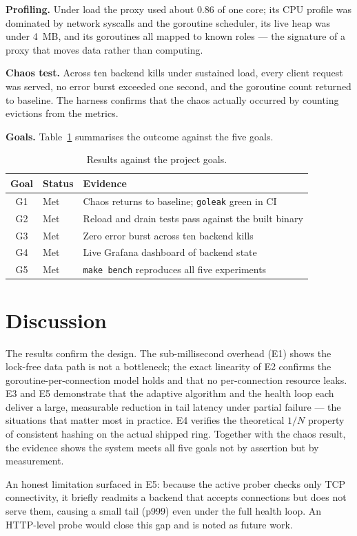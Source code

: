 \documentclass[11pt,a4paper]{report}
\newcommand{\code}[1]{\texttt{#1}}
\begin{document}
\textbf{Profiling.} Under load the proxy used about 0.86 of one core; its CPU profile was
dominated by network syscalls and the goroutine scheduler, its live heap was under 4~MB, and its
goroutines all mapped to known roles --- the signature of a proxy that moves data rather than
computing.

\textbf{Chaos test.} Across ten backend kills under sustained load, every client request was
served, no error burst exceeded one second, and the goroutine count returned to baseline. The
harness confirms that the chaos actually occurred by counting evictions from the metrics.

\textbf{Goals.} Table~\ref{tab:goals} summarises the outcome against the five goals.

\begin{table}[htbp]
\centering
\caption{Results against the project goals.}
\label{tab:goals}
\begin{tabular}{cll}
\toprule
Goal & Status & Evidence\\
\midrule
G1 & Met & Chaos returns to baseline; \code{goleak} green in CI\\
G2 & Met & Reload and drain tests pass against the built binary\\
G3 & Met & Zero error burst across ten backend kills\\
G4 & Met & Live Grafana dashboard of backend state\\
G5 & Met & \code{make bench} reproduces all five experiments\\
\bottomrule
\end{tabular}
\end{table}

\section{Discussion}
The results confirm the design. The sub-millisecond overhead (E1) shows the lock-free data path
is not a bottleneck; the exact linearity of E2 confirms the goroutine-per-connection model holds
and that no per-connection resource leaks. E3 and E5 demonstrate that the adaptive algorithm and
the health loop each deliver a large, measurable reduction in tail latency under partial failure
--- the situations that matter most in practice. E4 verifies the theoretical $1/N$ property of
consistent hashing on the actual shipped ring. Together with the chaos result, the evidence shows
the system meets all five goals not by assertion but by measurement.

An honest limitation surfaced in E5: because the active prober checks only TCP connectivity, it
briefly readmits a backend that accepts connections but does not serve them, causing a small tail
(p999) even under the full health loop. An HTTP-level probe would close this gap and is noted as
future work.
\end{document}
